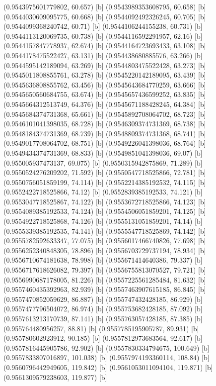 {{{(0.9543975601779802, 60.657) [b] 
(0.9543989353608795, 60.658) [b] 
(0.9544030609095775, 60.668) [b] 
(0.9544092492326245, 60.705) [b] 
(0.9544099368240742, 60.71) [b] 
(0.9544106244155238, 60.731) [b] 
(0.9544113120069735, 60.738) [b] 
(0.9544116592291957, 62.16) [b] 
(0.9544157847778937, 62.674) [b] 
(0.9544164723693433, 63.108) [b] 
(0.9544178475522427, 63.131) [b] 
(0.954438680885576, 63.266) [b] 
(0.9544595142189094, 63.269) [b] 
(0.9544803475522428, 63.273) [b] 
(0.9545011808855761, 63.278) [b] 
(0.9545220142189095, 63.439) [b] 
(0.9545636808855762, 63.456) [b] 
(0.9545643684770259, 63.666) [b] 
(0.9545650560684755, 63.674) [b] 
(0.9545657436599252, 63.835) [b] 
(0.9545664312513749, 64.376) [b] 
(0.9545671188428245, 64.384) [b] 
(0.9545684374731368, 65.661) [b] 
(0.9545892708064702, 68.723) [b] 
(0.9546101041398035, 68.728) [b] 
(0.9546309374731369, 68.738) [b] 
(0.9548184374731369, 68.739) [b] 
(0.9548809374731368, 68.741) [b] 
(0.9549017708064702, 68.751) [b] 
(0.9549226041398036, 68.764) [b] 
(0.9549434374731369, 68.833) [b] 
(0.9549851041398036, 69.07) [b] 
(0.955005937473137, 69.075) [b] 
(0.9550315942875869, 71.289) [b] 
(0.9550524276209202, 71.592) [b] 
(0.9550547718525866, 72.781) [b] 
(0.9550756051859199, 74.114) [b] 
(0.9552214385192532, 74.115) [b] 
(0.9552422718525866, 74.12) [b] 
(0.9552839385192533, 74.121) [b] 
(0.9553047718525867, 74.122) [b] 
(0.9553672718525866, 74.123) [b] 
(0.9554089385192533, 74.124) [b] 
(0.9554506051859201, 74.125) [b] 
(0.9554922718525868, 74.126) [b] 
(0.9555131051859201, 74.14) [b] 
(0.9555339385192535, 74.141) [b] 
(0.9555547718525869, 74.142) [b] 
(0.9555782592633347, 77.075) [b] 
(0.9556017466740826, 77.698) [b] 
(0.9556252340848305, 78.896) [b] 
(0.9556703729737194, 78.934) [b] 
(0.9556710674181638, 78.998) [b] 
(0.955671414640386, 79.337) [b] 
(0.9556717618626082, 79.397) [b] 
(0.9556755813070527, 79.721) [b] 
(0.9556990687178005, 81.226) [b] 
(0.9557225561285484, 81.632) [b] 
(0.9557460435392963, 82.939) [b] 
(0.9557463907615185, 86.845) [b] 
(0.9557470852059629, 86.887) [b] 
(0.955747432428185, 86.929) [b] 
(0.9557477796504072, 86.974) [b] 
(0.955753682428185, 87.092) [b] 
(0.9557613213170739, 87.141) [b] 
(0.955763057428185, 87.385) [b] 
(0.955764480956257, 88.81) [b] 
(0.9557785195905787, 89.931) [b] 
(0.955780602923912, 90.185) [b] 
(0.9557812973683564, 92.617) [b] 
(0.9557816445905786, 92.902) [b] 
(0.9557830334794675, 100.649) [b] 
(0.9557833807016897, 101.038) [b] 
(0.9557974193360114, 108.84) [b] 
(0.9560796442949605, 119.842) [b] 
(0.9561053011094104, 119.871) [b] 
(0.9561309579238603, 119.877) [b] 
}}}
